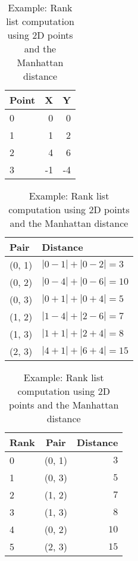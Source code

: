 \begin{table}
  \centering
  \caption{Example: Rank list computation using 2D points and the Manhattan distance}
  \label{tab:rank_list_example}

  \begin{tabular}{l r r}
    \toprule
    Point & X & Y \\
    \midrule
    0 & 0 & 0 \\
    1 & 1 & 2 \\
    2 & 4 & 6 \\
    3 & -1 & -4 \\
    \bottomrule
  \end{tabular}

  \vspace{0.5cm}

  \begin{tabular}{l l}
    \toprule
    Pair & Distance \\
    \midrule
    (0, 1) & $|0-1| + |0-2| = 3$ \\
    (0, 2) & $|0-4| + |0-6| = 10$ \\
    (0, 3) & $|0+1| + |0+4| = 5$ \\
    (1, 2) & $|1-4| + |2-6| = 7$ \\
    (1, 3) & $|1+1| + |2+4| = 8$ \\
    (2, 3) & $|4+1| + |6+4| = 15$ \\
    \bottomrule
  \end{tabular}

  \vspace{0.5cm}

  \begin{tabular}{l c r}
    \toprule
    Rank & Pair & Distance \\
    \midrule
    0 & (0, 1) & $3$ \\
    1 & (0, 3) & $5$ \\
    2 & (1, 2) & $7$ \\
    3 & (1, 3) & $8$ \\
    4 & (0, 2) & $10$ \\
    5 & (2, 3) & $15$ \\
    \bottomrule
  \end{tabular}
\end{table}
